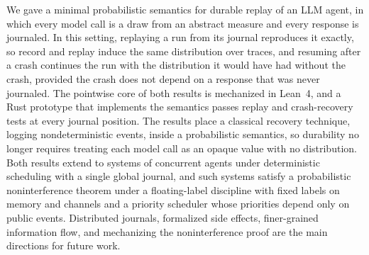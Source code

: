 
We gave a minimal probabilistic semantics for durable replay of an LLM agent, in which every
model call is a draw from an abstract measure and every response is journaled.
In this setting, replaying a run from its journal reproduces it exactly, so record and replay
induce the same distribution over traces, and resuming after a crash continues the run with
the distribution it would have had without the crash, provided the crash does not depend on a
response that was never journaled.
The pointwise core of both results is mechanized in Lean~4, and a Rust prototype that
implements the semantics passes replay and crash-recovery tests at every journal position.
The results place a classical recovery technique, logging nondeterministic events, inside a
probabilistic semantics, so durability no longer requires treating each model call as an opaque
value with no distribution.
Both results extend to systems of concurrent agents under deterministic scheduling with a
single global journal, and such systems satisfy a probabilistic noninterference theorem under a
floating-label discipline with fixed labels on memory and channels and a priority scheduler
whose priorities depend only on public events.
Distributed journals, formalized side effects, finer-grained information flow, and
mechanizing the noninterference proof are the main directions for future work.
